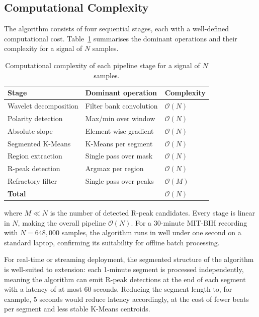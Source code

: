\documentclass[11pt]{article}
\begin{document}
\subsection{Computational Complexity}\label{subsec:complexity}

The algorithm consists of four sequential stages, each with a well-defined computational cost. Table~\ref{tab:complexity} summarises the dominant operations and their complexity for a signal of $N$ samples.

\begin{table}[htbp]
\centering
\caption{Computational complexity of each pipeline stage for a signal of $N$ samples.}
\label{tab:complexity}
\begin{tabular}{lll}
\toprule
\textbf{Stage} & \textbf{Dominant operation} & \textbf{Complexity} \\
\midrule
Wavelet decomposition  & Filter bank convolution & $\mathcal{O}(N)$ \\
Polarity detection     & Max/min over window     & $\mathcal{O}(N)$ \\
Absolute slope         & Element-wise gradient   & $\mathcal{O}(N)$ \\
Segmented K-Means      & K-Means per segment     & $\mathcal{O}(N)$ \\
Region extraction      & Single pass over mask   & $\mathcal{O}(N)$ \\
R-peak detection       & Argmax per region       & $\mathcal{O}(N)$ \\
Refractory filter      & Single pass over peaks  & $\mathcal{O}(M)$ \\
\midrule
\textbf{Total}         &                         & $\mathcal{O}(N)$ \\
\bottomrule
\end{tabular}
\end{table}

where $M \ll N$ is the number of detected R-peak candidates. Every stage is linear in $N$, making the overall pipeline $\mathcal{O}(N)$. For a 30-minute MIT-BIH recording with $N = 648{,}000$ samples, the algorithm runs in well under one second on a standard laptop, confirming its suitability for offline batch processing.

For real-time or streaming deployment, the segmented structure of the algorithm is well-suited to extension: each 1-minute segment is processed independently, meaning the algorithm can emit R-peak detections at the end of each segment with a latency of at most 60 seconds. Reducing the segment length to, for example, 5 seconds would reduce latency accordingly, at the cost of fewer beats per segment and less stable K-Means centroids.
\end{document}
